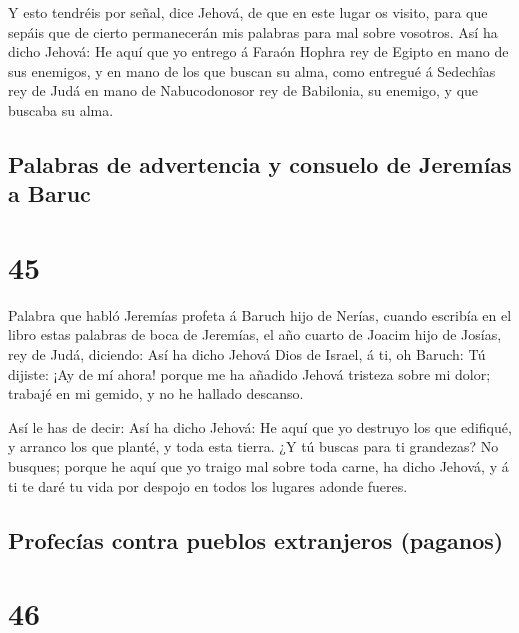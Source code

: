  Y esto tendréis por señal, dice Jehová, de que en este
lugar os visito, para que sepáis que de cierto permanecerán mis palabras
para mal sobre vosotros.  Así ha dicho Jehová: He aquí
que yo entrego á Faraón Hophra rey de Egipto en mano de sus enemigos, y
en mano de los que buscan su alma, como entregué á Sedechîas rey de Judá
en mano de Nabucodonosor rey de Babilonia, su enemigo, y que buscaba su
alma.

\hypertarget{palabras-de-advertencia-y-consuelo-de-jeremuxedas-a-baruc}{%
\subsection{Palabras de advertencia y consuelo de Jeremías a
Baruc}\label{palabras-de-advertencia-y-consuelo-de-jeremuxedas-a-baruc}}

\hypertarget{section-24-45}{%
\section{45}\label{section-24-45}}

 Palabra que habló Jeremías profeta á Baruch hijo de
Nerías, cuando escribía en el libro estas palabras de boca de Jeremías,
el año cuarto de Joacim hijo de Josías, rey de Judá, diciendo:
 Así ha dicho Jehová Dios de Israel, á ti, oh Baruch:
 Tú dijiste: ¡Ay de mí ahora! porque me ha añadido Jehová
tristeza sobre mi dolor; trabajé en mi gemido, y no he hallado descanso.

 Así le has de decir: Así ha dicho Jehová: He aquí que yo
destruyo los que edifiqué, y arranco los que planté, y toda esta tierra.
 ¿Y tú buscas para ti grandezas? No busques; porque he
aquí que yo traigo mal sobre toda carne, ha dicho Jehová, y á ti te daré
tu vida por despojo en todos los lugares adonde fueres.

\hypertarget{profecuxedas-contra-pueblos-extranjeros-paganos}{%
\subsection{Profecías contra pueblos extranjeros
(paganos)}\label{profecuxedas-contra-pueblos-extranjeros-paganos}}

\hypertarget{section-24-46}{%
\section{46}\label{section-24-46}}

